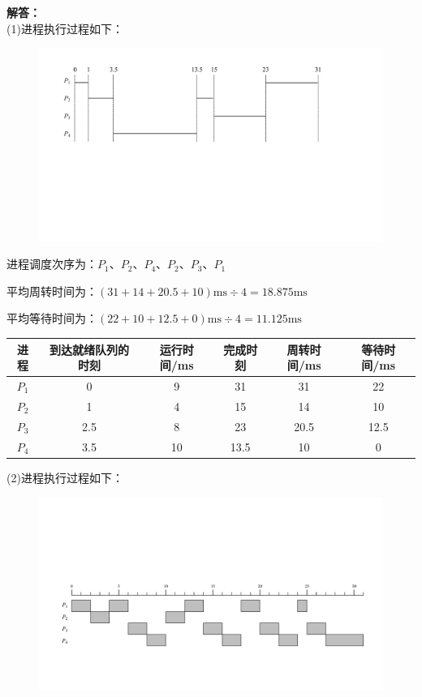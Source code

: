 \documentclass[10pt,a4paper,UTF8]{ctexart}
\newenvironment{solution}{\noindent\textbf{解答：}\\ \indent}{\par}
\begin{document}
\begin{solution}
	(1)进程执行过程如下：
	\begin{figure}[H]
		\centering
		\vspace{-0.5em}
		\includegraphics[width=0.6\linewidth]{img/6.1.pdf}
		\vspace{-1em}
	\end{figure}
	进程调度次序为：$P_1$、$P_2$、$P_4$、$P_2$、$P_3$、$P_1$
	
	平均周转时间为：$(31+14+20.5+10)\mathrm{ms} \div 4=18.875\mathrm{ms}$
	
	平均等待时间为：$(22+10+12.5+0)\mathrm{ms} \div 4=11.125\mathrm{ms}$

	\begin{table}[H]
		\vspace{-0.5em}
		\centering
		\begin{tabular}{|c|c|c|c|c|c|}
		\hline
		进程 & 到达就绪队列的时刻 & 运行时间/ms & 完成时刻 & 周转时间/ms & 等待时间/ms \\ \hline
		$P_1$ & 0         & 9       & 31   & 31      & 22      \\ \hline
		$P_2$ & 1         & 4       & 15   & 14      & 10      \\ \hline
		$P_3$ & 2.5       & 8       & 23   & 20.5    & 12.5    \\ \hline
		$P_4$ & 3.5       & 10      & 13.5 & 10      & 0       \\ \hline
		\end{tabular}
		\vspace{-1.5em}
	\end{table}

	(2)进程执行过程如下：

	\begin{figure}[H]
		\centering
		\vspace{-0.5em}
		\includegraphics[width=0.85\linewidth]{img/6.2.pdf}
		\vspace{-1em}
	\end{figure}


\end{solution}
\end{document}
